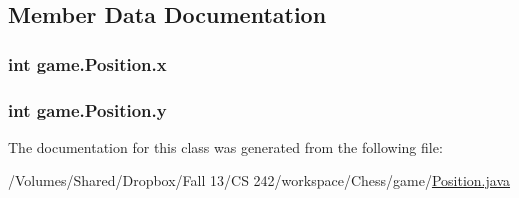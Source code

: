 \subsection{Member Data Documentation}
\hypertarget{classgame_1_1_position_a84cd22aa467b66df4e31bf76da2fbb48}{
\subsubsection[{x}]{\setlength{\rightskip}{0pt plus 5cm}int game.\-Position.\-x\hspace{0.3cm}{\ttfamily [private]}}}\label{classgame_1_1_position_a84cd22aa467b66df4e31bf76da2fbb48}
\hypertarget{classgame_1_1_position_aa59625ace3e203e899d47f125388f751}{
\subsubsection[{y}]{\setlength{\rightskip}{0pt plus 5cm}int game.\-Position.\-y\hspace{0.3cm}{\ttfamily [private]}}}\label{classgame_1_1_position_aa59625ace3e203e899d47f125388f751}


The documentation for this class was generated from the following file\-:\begin{DoxyCompactItemize}
\item 
/\-Volumes/\-Shared/\-Dropbox/\-Fall 13/\-C\-S 242/workspace/\-Chess/game/\hyperlink{_position_8java}{Position.\-java}\end{DoxyCompactItemize}
